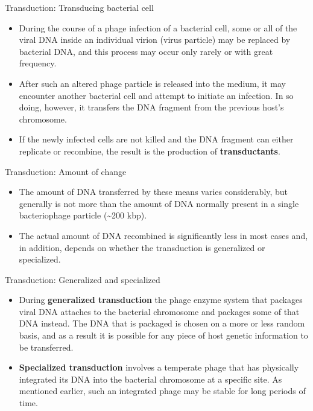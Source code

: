 \documentclass[ignorenonframetext,aspectratio=169]{beamer}
\providecommand{\tightlist}{%
  \setlength{\itemsep}{0pt}\setlength{\parskip}{0pt}}
\begin{document}
\begin{frame}{Transduction: Transducing bacterial cell}
\protect\hypertarget{transduction-transducing-bacterial-cell}{}

\begin{itemize}
\tightlist
\item
  During the course of a phage infection of a bacterial cell, some or
  all of the viral DNA inside an individual virion (virus particle) may
  be replaced by bacterial DNA, and this process may occur only rarely
  or with great frequency.
\item
  After such an altered phage particle is released into the medium, it
  may encounter another bacterial cell and attempt to initiate an
  infection. In so doing, however, it transfers the DNA fragment from
  the previous host's chromosome.
\item
  If the newly infected cells are not killed and the DNA fragment can
  either replicate or recombine, the result is the production of
  \textbf{transductants}.
\end{itemize}

\end{frame}

\begin{frame}{Transduction: Amount of change}
\protect\hypertarget{transduction-amount-of-change}{}

\begin{itemize}
\tightlist
\item
  The amount of DNA transferred by these means varies considerably, but
  generally is not more than the amount of DNA normally present in a
  single bacteriophage particle (\textasciitilde{}200 kbp).
\item
  The actual amount of DNA recombined is significantly less in most
  cases and, in addition, depends on whether the transduction is
  generalized or specialized.
\end{itemize}

\end{frame}

\begin{frame}{Transduction: Generalized and specialized}
\protect\hypertarget{transduction-generalized-and-specialized}{}

\begin{itemize}
\tightlist
\item
  During \textbf{generalized transduction} the phage enzyme system that
  packages viral DNA attaches to the bacterial chromosome and packages
  some of that DNA instead. The DNA that is packaged is chosen on a more
  or less random basis, and as a result it is possible for any piece of
  host genetic information to be transferred.
\item
  \textbf{Specialized transduction} involves a temperate phage that has
  physically integrated its DNA into the bacterial chromosome at a
  specific site. As mentioned earlier, such an integrated phage may be
  stable for long periods of time.
\end{itemize}

\end{frame}
\end{document}
